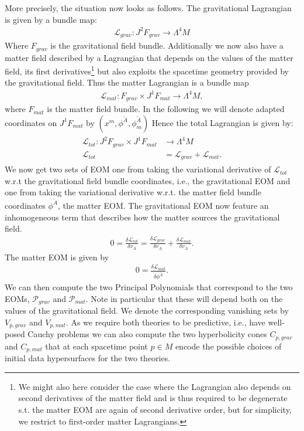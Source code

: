 More precisely, the situation now looks as follows.
The gravitational Lagrangian is given by a bundle map:
\begin{align}
    \mathcal{L}_{grav} : J^2F_{grav} \longrightarrow \Lambda^4M
\end{align}
Where $F_{grav}$ is the gravitational field bundle. Additionally we now also have a matter field described by a Lagrangian that depends on the values of the matter field, its first derivatives\footnote{We might also here consider the case where the Lagrangian also depends on second derivatives of the matter field and is thus required to be degenerate s.t. the matter EOM are again of second derivative order, but for simplicity, we restrict to first-order matter Lagrangians.} but also exploits the spacetime geometry provided by the gravitational field. Thus the matter Lagrangian is a bundle map
\begin{align}
    \mathcal{L}_{mat} : F_{grav} \times J^1F_{mat} \longrightarrow \Lambda^4M,
\end{align}
where $F_{mat}$ is the matter field bundle. In the following we will denote adapted coordinates on $J^1F_{mat}$ by $(x^m,\phi^{\tilde{A}},\phi^{\tilde{A}}_m)$ Hence the total Lagrangian is given by:
\begin{align}
\begin{aligned}
    \mathcal{L}_{tot} : J^2F_{grav} \times J^1F_{mat} &\longrightarrow \Lambda^4M \\
    \mathcal{L}_{tot} &= \mathcal{L}_{grav} + \mathcal{L}_{mat}.
\end{aligned}
\end{align}
We now get two sets of EOM one from taking the variational derivative of $\mathcal{L}_{tot}$ w.r.t the gravitational field bundle coordinates, i.e., the gravitational EOM and one from taking the variational derivative w.r.t. the matter field bundle coordinates $\phi^{\tilde{A}}$, the matter EOM.
The gravitational EOM now feature an inhomogeneous term that describes how the matter sources the gravitational field.
\begin{align}
    0 = \frac{\delta \mathcal{L}_{tot}}{\delta v_A} = \frac{\delta \mathcal{L}_{grav}}{\delta v_A} + \frac{\delta \mathcal{L}_{mat}}{\delta v_A}.
\end{align}
The matter EOM is given by 
\begin{align}
    0 = \frac{\delta \mathcal{L}_{mat}}{\delta \phi^{\tilde{A}}}.
\end{align}
We can then compute the two Principal Polynomials that correspond to the two EOMs, $\mathcal{P}_{grav}$ and $\mathcal{P}_{mat}$. Note in particular that these will depend both on the values of the gravitational field. We denote the corresponding vanishing sets by $V_{p,grav}$ and $V_{p,mat}$. As we require both theories to be predictive, i.e., have well-posed Cauchy problems we can also compute the two hyperbolicity cones $C_{p,grav}$ and $C_{p,mat}$ that at each spacetime point $p\in M$ encode the possible choices of initial data hypersurfaces for the two theories. 

